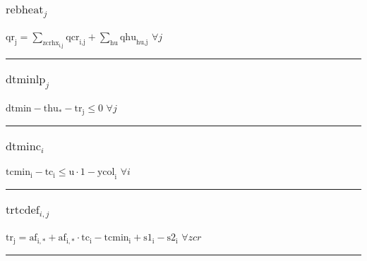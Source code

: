 \documentclass[11pt]{article}
\begin{document}
\subsubsection*{\begin{math}\text{rebheat}_{j}\end{math}}
\begin{math}
\text{qr}_{\text{j}} = \displaystyle \sum_{\text{zcrhx}_{\text{i},\text{j}}} \text{qcr}_{\text{i},\text{j}} + \displaystyle \sum_{\text{hu}} \text{qhu}_{\text{hu},\text{j}}
\end{math}
\hfill
\begin{math}
\forall j
\end{math}\vspace{5pt}
\hrule
\subsubsection*{\begin{math}\text{dtminlp}_{j}\end{math}}
\begin{math}
\text{dtmin} - \text{thu}_{*} - \text{tr}_{\text{j}} \leq 0
\end{math}
\hfill
\begin{math}
\forall j
\end{math}\vspace{5pt}
\hrule
\subsubsection*{\begin{math}\text{dtminc}_{i}\end{math}}
\begin{math}
\text{tcmin}_{\text{i}} - \text{tc}_{\text{i}} \leq \text{u} \cdot 1 - \text{ycol}_{\text{i}}
\end{math}
\hfill
\begin{math}
\forall i
\end{math}\vspace{5pt}
\hrule
\subsubsection*{\begin{math}\text{trtcdef}_{i,j}\end{math}}
\begin{math}
\text{tr}_{\text{j}} = \text{af}_{\text{i},*} + \text{af}_{\text{i},*} \cdot \text{tc}_{\text{i}} - \text{tcmin}_{\text{i}} + \text{s1}_{\text{i}} - \text{s2}_{\text{i}}
\end{math}
\hfill
\begin{math}
\forall zcr
\end{math}\vspace{5pt}
\hrule
\end{document}
